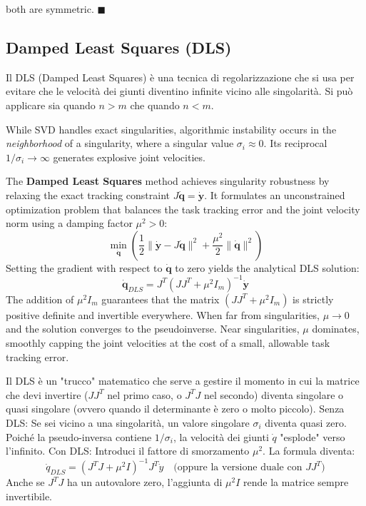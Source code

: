 both are symmetric. $\blacksquare$

\subsection{Damped Least Squares (DLS)}
\label{sec:DLS}


Il DLS (Damped Least Squares) è una tecnica di regolarizzazione che si usa per evitare che le velocità dei 
giunti diventino infinite vicino alle singolarità. Si può applicare sia quando $n > m$ che quando $n < m$.

While SVD handles exact singularities, algorithmic instability occurs in the \textit{neighborhood} of a 
singularity, where a singular value $\sigma_i \approx 0$. Its reciprocal $1/\sigma_i \to \infty$ generates explosive joint velocities.

The \textbf{Damped Least Squares} method achieves singularity robustness by relaxing the exact tracking 
constraint $J\dot{\mathbf{q}} = \dot{\mathbf{y}}$. It formulates an unconstrained optimization problem that 
balances the task tracking error and the joint velocity norm using a damping factor $\mu^2 > 0$:
\begin{equation}
    \min_{\dot{\mathbf{q}}} \left( \frac{1}{2} \|\dot{\mathbf{y}} - J\dot{\mathbf{q}}\|^2 + \frac{\mu^2}{2} \|\dot{\mathbf{q}}\|^2 \right)
\end{equation}
Setting the gradient with respect to $\dot{\mathbf{q}}$ to zero yields the analytical DLS solution:
\begin{equation}
    \dot{\mathbf{q}}_{DLS} = J^T(J J^T + \mu^2 I_m)^{-1} \dot{\mathbf{y}}
\end{equation}
The addition of $\mu^2 I_m$ guarantees that the matrix $(J J^T + \mu^2 I_m)$ is 
strictly positive definite and invertible everywhere. When far from singularities, 
$\mu \to 0$ and the solution converges to the pseudoinverse. Near singularities, $\mu$ dominates, 
smoothly capping the joint velocities at the cost of a small, allowable task tracking error.

Il DLS è un "trucco" matematico che serve a gestire il momento in cui la matrice che devi invertire ($JJ^T$ nel primo caso, o $J^TJ$ nel secondo) 
diventa singolare o quasi singolare (ovvero quando il determinante è zero o molto piccolo).
Senza DLS: Se sei vicino a una singolarità, un valore singolare $\sigma_i$ diventa quasi zero. 
Poiché la pseudo-inversa contiene $1/\sigma_i$, la velocità dei giunti $\dot{q}$ "esplode" verso l'infinito.
Con DLS: Introduci il fattore di smorzamento $\mu^2$. 
La formula diventa:$$\dot{q}_{DLS} = (J^T J + \mu^2 I)^{-1} J^T \dot{y} \quad \text{(oppure la versione duale con } JJ^T\text{)}$$
Anche se $J^TJ$ ha un autovalore zero, l'aggiunta di $\mu^2 I$ rende la matrice sempre invertibile.